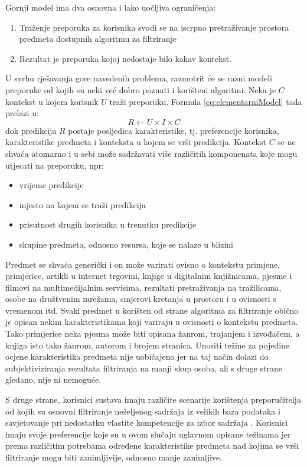 \documentclass[times, utf8, diplomski, numeric]{fer}
\begin{document}
Gornji model ima dva osnovna i lako uočljiva ograničenja:
\begin{enumerate}
  \item Traženje preporuka za korisnika svodi se na iscrpno pretraživanje
  prostora predmeta dostupnih algoritmu za filtriranje
  \item Rezultat je preporuka kojoj nedostaje bilo kakav kontekst.
\end{enumerate}

U svrhu rješavanja gore navedenih problema, razmotrit će se razni modeli
preporuke od kojih su neki već dobro poznati i korišteni algoritmi. Neka je $C$
kontekst u kojem korisnik $U$ traži preporuku. Formula \ref{eq:elementarniModel}
tada prelazi u:
\begin{equation}
\label{eq:elementarniModelSKontekstom}
	R \leftarrow U \times I \times C
\end{equation}
dok predikcija $R$ postaje posljedica karakteristike, tj. preferencije
korisnika, karakteristike predmeta i konteksta u kojem se vrši predikcija.
Kontekst $C$ se ne shvaća atomarno i u sebi može sadržavati više različitih
komponenata koje mogu utjecati na preporuku, npr:
\begin{itemize}
  \item vrijeme predikcije
  \item mjesto na kojem se traži predikcija
  \item prisutnost drugih korisnika u trenutku predikcije
  \item skupine predmeta, odnosno resursa, koje se nalaze u blizini
\end{itemize}

Predmet se shvaća generički i on može varirati ovisno o kontekstu primjene,
primjerice, artikli u internet trgovini, knjige u digitalnim knjižnicama, pjesme
i filmovi na multimedijalnim servisima, rezultati pretraživanja na tražilicama,
osobe na društvenim mrežama, smjerovi kretanja u prostoru i u ovisnosti s
vremenom itd. Svaki predmet u korišten od strane algoritma za filtriranje obično
je opisan nekim karakteristikama koji variraju u ovisnosti o kontekstu predmeta.
Tako primjerice neka pjesma može biti opisana žanrom, trajanjem i izvođačem, a
knjiga isto tako žanrom, autorom i brojem stranica. Unositi težine za pojedine
ocjene karakteristika predmeta nije uobičajeno jer na taj način dolazi do
subjektiviziranja rezultata filtriranja na manji skup osoba, ali s druge strane
gledano, nije ni nemoguće.

S druge strane, korisnici sustava imaju različite scenarije korištenja
preporučitelja od kojih su osnovni filtriranje neželjenog sadržaja iz velikih
baza podataka i savjetovanje pri nedostatku vlastite kompetencije za izbor
sadržaja \cite{AskIda}. Korisnici imaju svoje preferencije koje su u ovom
slučaju uglavnom opisane težinama jer prema različitim potrebama određene
karakteristike predmeta nad kojima se vrši filtriranje mogu biti zanimljivije,
odnosno manje zanimljive.
\end{document}
